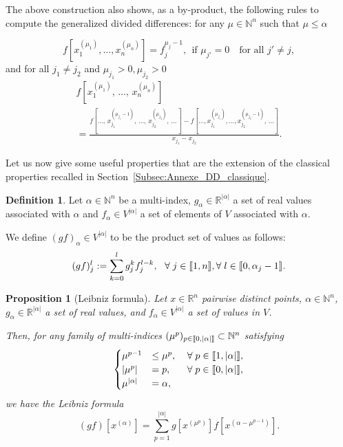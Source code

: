 \documentclass[11pt]{article}
\newtheorem{prop}[theo]{Proposition}
\theoremstyle{definition}
\newtheorem{defi}[theo]{Definition}
\numberwithin{equation}{section}
\numberwithin{figure}{section}
\numberwithin{table}{section}
\newcommand{\llbracket}{\mathopen{[\mkern -2.7mu[}}
\newcommand{\rrbracket}{\mathclose{]\mkern -2.7mu]}}
\newcommand{\inter}[2]{\llbracket #1,#2 \rrbracket}
\newcommand{\N}{\mathbb{N}}
\newcommand{\R}{\mathbb{R}}
\let\oldforall\forall
\renewcommand*{\forall}{\mathrel{\oldforall}}
\begin{document}
The above construction also shows, as a by-product, the following rules to compute the generalized divided differences: for any $\mu\in \N^n$ such that $\mu\leq \alpha$

\begin{equation}\label{rule1}
f\left[x_1^{(\mu_1)},\dotsc,x_n^{(\mu_n)}\right] = f_j^{\mu_j-1}, \ \ \text{if }\mu_{j'}=0\quad\text{for all }j'\neq j,
\end{equation}
and for all $j_1\neq j_2$ and $\mu_{j_1}>0, \mu_{j_2}>0$
\begin{multline}\label{rule2}
f\left[x_1^{(\mu_1)}\!\!,\,\dotsc,\,x_n^{(\mu_n)}\right]\\
= \frac{f\left[\dotsc,\,x_{j_1}^{(\mu_{j_1}-1)}\!,\,\dotsc,\,x_{j_2}^{(\mu_{j_2})}\!,\,\dotsc\,\right] - f\left[\dotsc,x_{j_1}^{(\mu_{j_1})}\!,\dotsc,x_{j_2}^{(\mu_{j_2}-1)}\!,\,\dotsc\right]}{x_{j_1}-x_{j_2}}.
\end{multline}



Let us now give some useful properties that are the extension of the classical properties recalled in Section~\ref{Subsec:Annexe_DD_classique}.
\begin{defi}\label{Defi:produit_GDD}
Let $\alpha\in \N^n$ be a multi-index, $g_\alpha\in \R^{|\alpha|}$ a set of real values associated with $\alpha$ and $f_\alpha\in V^{|\alpha|}$ a set of elements of $V$ associated with $\alpha$.

We define $(gf)_\alpha\in V^{|\alpha|}$ to be the product set of values as follows:
\[
(gf)_j^l := \sum_{k=0}^l g_j^k f_j^{l-k}, \ \ \forall j\in \inter{1}{n}, \forall l\in \inter{0}{\alpha_j-1}.
\]
\end{defi}

\begin{prop}[Leibniz formula]\label{Prop:GDD_Leibniz}
Let $x\in \R^n$ pairwise distinct points, $\alpha\in \N^n$, $g_\alpha\in \R^{|\alpha|}$ a set of real values, and $f_\alpha\in V^{|\alpha|}$ a set of values in $V$.

Then, for any family of multi-indices $(\mu^p)_{p\in \inter{0}{|\alpha|}} \subset \N^n $ satisfying
\begin{equation}\label{prop_muk}
\begin{cases}
\mu^{p-1}&\leq \mu^{p}, \mkern20mu \forall p\in\inter{1}{|\alpha|},\\
|\mu^p| &= p, \mkern30mu \forall p\in \inter{0}{|\alpha|},\\
\mu^{|\alpha|}&=\alpha,
\end{cases}
\end{equation}
we have the Leibniz formula
\[
(gf)\left[x^{(\alpha)}\right] = \sum_{p=1}^{|\alpha|} g\left[x^{(\mu^p)}\right] f\left[x^{(\alpha-\mu^{p-1})}\right].
\]
\end{prop}
\end{document}
